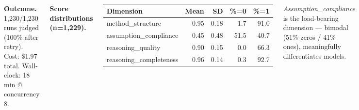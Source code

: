 \documentclass[a0paper,landscape,25pt,margin=1cm,innermargin=15mm,blockverticalspace=10mm,colspace=10mm,subcolspace=8mm]{tikzposter}
\begin{document}
\begin{columns}
{    \vspace{2mm}
    \textbf{Outcome.} 1{,}230/1{,}230 runs judged (100\% after retry).
    Cost: \$1.97 total. Wall-clock: 18 min @ concurrency 8.

    \vspace{2mm}
    \textbf{Score distributions (n=1{,}229).}
    \begin{center}
    \begin{tabular}{lrrrr}
      \toprule
      Dimension & Mean & SD & \%=0 & \%=1 \\
      \midrule
      method\_structure       & 0.95 & 0.18 &  1.7 & 91.0 \\
      assumption\_compliance  & 0.45 & 0.48 & 51.5 & 40.7 \\
      reasoning\_quality      & 0.90 & 0.15 &  0.0 & 66.3 \\
      reasoning\_completeness & 0.96 & 0.14 &  0.3 & 92.7 \\
      \bottomrule
    \end{tabular}
    \end{center}
    \emph{Assumption\_compliance} is the load-bearing dimension ---
    bimodal (51\% zeros / 41\% ones), meaningfully differentiates
    models.
  }
\end{columns}
\end{document}
